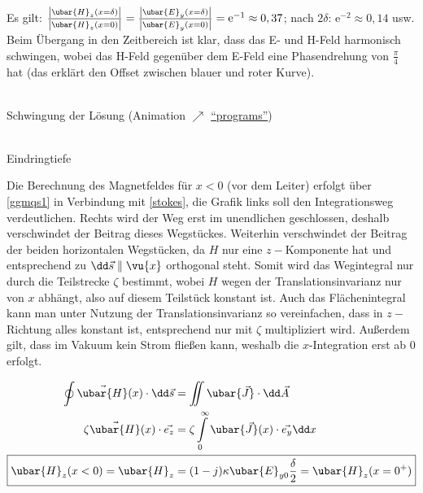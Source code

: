 			  Es gilt: $\frac{\left| \ubar{H}_{z}(x = \delta) \right|}{\left| \ubar{H}_{z}(x = 0) \right|} = \frac{\left| \ubar{E}_{y}(x = \delta) \right|}{\left| \ubar{E}_{y}(x = 0) \right|}=  \mathrm{e}^{-1} \approx 0,37$; nach $2\delta$: $ \mathrm{e}^{-2} \approx 0,14$ usw. Beim Übergang in den Zeitbereich ist klar, dass das E- und H-Feld harmonisch schwingen, wobei das H-Feld gegenüber dem E-Feld eine Phasendrehung von $\frac{\pi}{4}$ hat (das erklärt den Offset zwischen blauer und roter Kurve). 
\begin{center}
		  \begin{minipage}{\textwidth}
			  \centering
			  \resizebox{.8\textwidth}{!}{}\\
			  Schwingung der Lösung (Animation $\nearrow$ \href{https://github.com/hgkdd/TET/tree/main/programs}{\enquote{programs}}) \label{schwingdloes}
		  \end{minipage}
		  \begin{minipage}{\textwidth}
			  \centering
			  \resizebox{.8\textwidth}{!}{}\\
			  Eindringtiefe
		  \end{minipage}
		  \end{center}
Die Berechnung des Magnetfeldes für $x<0$ (vor dem Leiter) erfolgt über \ref{ggmqs1} in Verbindung mit \ref{stokes}, die Grafik links soll den Integrationsweg verdeutlichen. Rechts wird der Weg erst im unendlichen geschlossen, deshalb verschwindet der Beitrag dieses Wegstückes. Weiterhin verschwindet der Beitrag der beiden horizontalen Wegstücken, da $H$ nur eine $z-$Komponente hat und entsprechend zu $\dd\vec{s}\parallel\vu{x}$ orthogonal steht. Somit wird das Wegintegral nur durch die Teilstrecke $\zeta$ bestimmt, wobei $H$ wegen der Translationsinvarianz nur von $x$ abhängt, also auf diesem Teilstück konstant ist. Auch das Flächenintegral kann man unter Nutzung der Translationsinvarianz so vereinfachen, dass in $z-$Richtung alles konstant ist, entsprechend nur mit $\zeta$ multipliziert wird. Außerdem gilt, dass im Vakuum kein Strom fließen kann, weshalb die $x$-Integration erst ab 0 erfolgt.\\
\begin{minipage}{0.5\textwidth}
			        \resizebox{.9\textwidth}{!}{}
\end{minipage}
\begin{minipage}{0.5\textwidth}
\begin{align*}
	\oint \vec{\ubar{H}}(x)\cdot \dd\vec{s} & = \iint \ubar{\vec{J}}\cdot\dd\vec{A}                               \\
	\zeta \vec{\ubar{H}}(x)\cdot \vec{e_z}  & = \zeta \int\limits_0^\infty \ubar{\vec{J}}(x)\cdot \vec{e_y} \dd x \\
	\Aboxed{\ubar{H}_z (x<0) =\ubar{H}_z            & = (1-j) \kappa \ubar{E}_{y0} \frac{\delta}{2} = \ubar{H}_z (x=0^+)}
\end{align*}
\end{minipage}	

